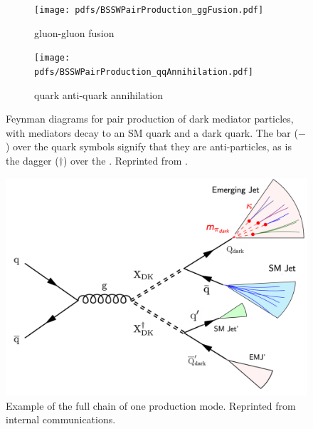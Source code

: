 \begin{figure}
	\begin{center}
		\begin{subfigure}{.45\linewidth}
			\texttt{[image: pdfs/BSSWPairProduction\_ggFusion.pdf]}
			\caption{gluon-gluon fusion}
		\end{subfigure}
		\begin{subfigure}{.45\linewidth}
			\texttt{[image: pdfs/BSSWPairProduction\_qqAnnihilation.pdf]}
			\caption{quark anti-quark annihilation}
		\end{subfigure}
	\end{center}
	\caption[Emergin jets production modes]{Feynman diagrams for pair production of dark mediator particles, with mediators decay to an SM quark and a dark quark. The bar ($-$) over the quark symbols signify that they are anti-particles, as is the dagger ($\dagger$) over the \Mdark. Reprinted from \cite{CMS:2024gxp}.}
	\label{fig:emj_production1}
\end{figure}

\begin{figure}
	\centering
	\includegraphics[width=.8\linewidth]{Images/EMJ_production.png}
	\caption[Example of the full chain of one production mode.]{Example of the full chain of one production mode. Reprinted from internal communications.}
	\label{fig:full-chain}
\end{figure}

